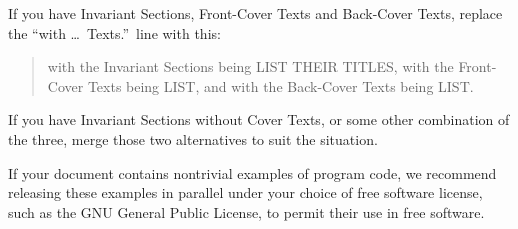 If you have Invariant Sections, Front-Cover Texts and Back-Cover Texts,
replace the ``with \dots\ Texts.''\ line with this:

\bigskip
\begin{quote}
    with the Invariant Sections being LIST THEIR TITLES, with the
    Front-Cover Texts being LIST, and with the Back-Cover Texts being LIST.
\end{quote}
\bigskip
    
If you have Invariant Sections without Cover Texts, or some other
combination of the three, merge those two alternatives to suit the
situation.

If your document contains nontrivial examples of program code, we
recommend releasing these examples in parallel under your choice of
free software license, such as the GNU General Public License,
to permit their use in free software.

